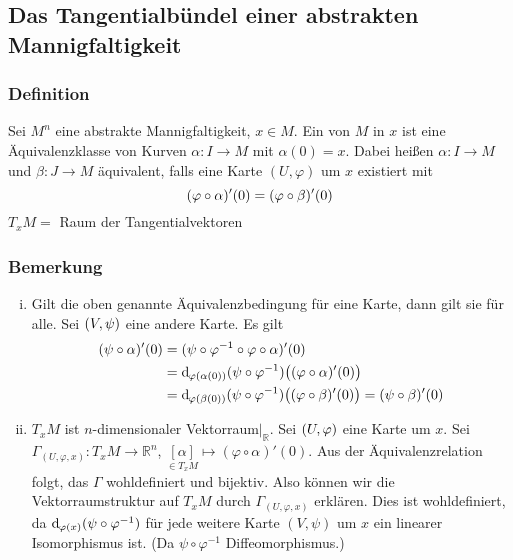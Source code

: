\subsection{Das Tangentialbündel einer abstrakten Mannigfaltigkeit}
\label{sub:15}

\subsubsection{Definition}
\label{ssub:128}
Sei $M^n$ eine abstrakte Mannigfaltigkeit, $x\in M$. Ein  von $M$ in $x$ ist eine Äquivalenzklasse von Kurven $\alpha : I\to M$ mit $\alpha(0) = x$. Dabei heißen $\alpha:I\to M$ und $\beta:J\to M$ äquivalent, falls eine Karte $(U,\varphi)$ um $x$ existiert mit
\[
\enbrace{\varphi \circ \alpha}'(0) = \enbrace{\varphi \circ \beta}'(0)
\]
$T_x M =$ Raum der Tangentialvektoren

\subsubsection{Bemerkung}
\label{ssub:129}
\begin{enumerate}[(i)]
\item Gilt die oben genannte Äquivalenzbedingung für eine Karte, dann gilt sie für alle.
Sei $\enbrace{V,\psi}$ eine andere Karte. Es gilt
\begin{align*}
\enbrace{\psi \circ \alpha}'(0) &= \enbrace{\psi \circ \varphi^{-1} \circ \varphi \circ \alpha}'(0)\\
&= \mathd_{\varphi(\alpha(0))} (\psi \circ \varphi^{-1})\enbrace[\big]{(\varphi \circ \alpha)'(0)}\\
&= \mathd_{\varphi(\beta(0))} (\psi \circ \varphi^{-1})\enbrace[\big]{(\varphi \circ \beta)'(0)} = \enbrace{\psi \circ \beta}'(0)
\end{align*}
\item $T_x M$ ist $n$-dimensionaler Vektorraum$\vert_{\mathds{R}}$.
Sei $\enbrace{U,\varphi}$ eine Karte um $x$. Sei $\Gamma_{(U,\varphi,x)}: T_x M\to \mathds{R}^n$, $\underset{\in T_x M}{[\alpha]} \mapsto (\varphi \circ \alpha)' (0)$. Aus der Äquivalenzrelation folgt, das $\Gamma$ wohldefiniert und bijektiv. Also können wir die Vektorraumstruktur auf $T_x M$ durch $\Gamma_{(U,\varphi,x)}$ erklären. Dies ist wohldefiniert, da $\mathd_{\varphi(x)} (\psi \circ \varphi^{-1})$ für jede weitere Karte $(V,\psi)$ um $x$ ein linearer Isomorphismus ist. (Da $\psi \circ \varphi^{-1}$ Diffeomorphismus.) 
\end{enumerate}

